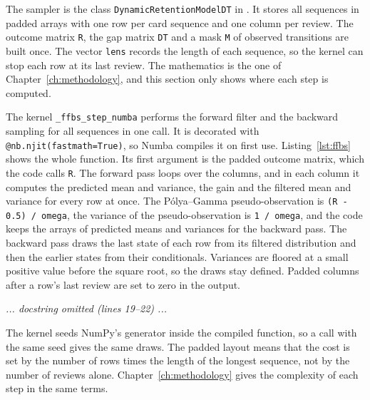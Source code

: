 The sampler is the class \texttt{DynamicRetentionModelDT} in .
It stores all sequences in padded arrays with one row per card sequence and one column per review. The
outcome matrix \texttt{R}, the gap matrix \texttt{DT} and a mask \texttt{M} of observed transitions are
built once. The vector \texttt{lens} records the length of each sequence, so the kernel can stop each
row at its last review. The mathematics is the one of Chapter~\ref{ch:methodology}, and this section
only shows where each step is computed.

The kernel \texttt{\_ffbs\_step\_numba} performs the forward filter and the backward sampling for all
sequences in one call. It is decorated with \texttt{@nb.njit(fastmath=True)}, so Numba compiles it on
first use. Listing~\ref{lst:ffbs} shows the whole function. Its first argument is the padded outcome
matrix, which the code calls \texttt{R}. The forward pass loops over the columns, and in each column it
computes the predicted mean and variance, the gain and the filtered mean and variance for every row at
once. The P\'olya--Gamma pseudo-observation is \texttt{(R - 0.5) / omega}, the variance of the
pseudo-observation is \texttt{1 / omega}, and the code keeps the arrays of predicted means and
variances for the backward pass. The backward pass draws the last state of each row from its filtered
distribution and then the earlier states from their conditionals. Variances are floored at a small
positive value before the square root, so the draws stay defined. Padded columns after a row's last
review are set to zero in the output.


\par\noindent\hfill{\footnotesize\ttfamily\itshape ... docstring omitted (lines 19--22) ...}\hfill\par


The kernel seeds NumPy's generator inside the compiled function, so a call with the same seed gives the
same draws. The padded layout means that the cost is set by the number of rows times the length of the
longest sequence, not by the number of reviews alone. Chapter~\ref{ch:methodology} gives the complexity
of each step in the same terms.

